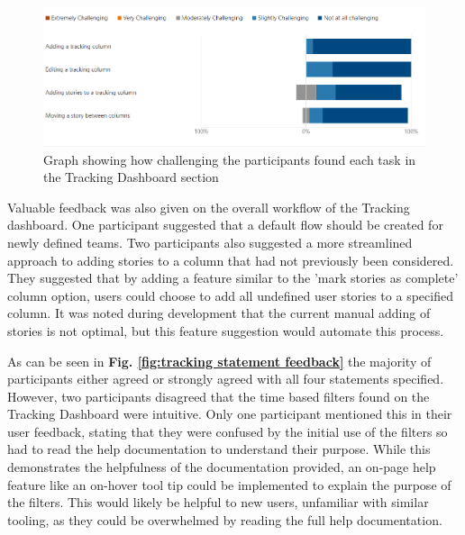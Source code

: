 \documentclass[l4proj.tex]{subfiles}
\begin{document}
\begin{figure}[h!]
\begin{center}
\includegraphics[scale=0.5]{dissertation/images/EvaluationTrackingChallengingGraph.png}
\caption{Graph showing how challenging the participants found each task in the Tracking Dashboard section}
\label{fig:tracking form feedback} 
\end{center}
\end{figure}

Valuable feedback was also given on the overall workflow of the Tracking dashboard. One participant suggested that a default flow should be created for newly defined teams. Two participants also suggested a more streamlined approach to adding stories to a column that had not previously been considered. They suggested that by adding a feature similar to the 'mark stories as complete' column option, users could choose to add all undefined user stories to a specified column. It was noted during development that the current manual adding of stories is not optimal, but this feature suggestion would automate this process.

As can be seen in \textbf{Fig. \ref{fig:tracking statement feedback}} the majority of participants either agreed or strongly agreed with all four statements specified. However, two participants disagreed that the time based filters found on the Tracking Dashboard were intuitive. Only one participant mentioned this in their user feedback, stating that they were confused by the initial use of the filters so had to read the help documentation to understand their purpose. While this demonstrates the helpfulness of the documentation provided, an on-page help feature like an on-hover tool tip could be implemented to explain the purpose of the filters. This would likely be helpful to new users, unfamiliar with similar tooling, as they could be overwhelmed by reading the full help documentation.
\end{document}
